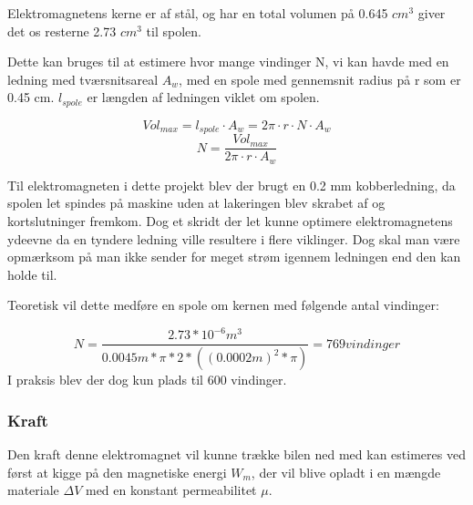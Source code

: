 Elektromagnetens kerne er af stål, og har en total volumen på 0.645 $cm^3$ giver det os resterne 2.73 $cm^3$ til spolen.

Dette kan bruges til at estimere hvor mange vindinger N, vi kan havde med en ledning med tværsnitsareal $A_w$, med en spole med gennemsnit radius på r som er 0.45 cm.  $l_{spole}$ er længden af ledningen viklet om spolen.

\begin{equation}
Vol_{max} =l_{spole} \cdot A_w = 2\pi \cdot r \cdot N \cdot A_w
\end{equation}
\begin{equation}
N= \frac{Vol_{max}}{2\pi \cdot r \cdot A_w}
\end{equation}

Til elektromagneten i dette projekt blev der brugt en 0.2 mm kobberledning, da spolen let spindes på maskine uden at lakeringen blev skrabet af og kortslutninger fremkom. Dog et skridt der let kunne optimere elektromagnetens ydeevne da en tyndere ledning ville resultere i flere viklinger. Dog skal man være opmærksom på man ikke sender for meget strøm igennem ledningen end den kan holde til.

Teoretisk vil dette medføre en spole om kernen med følgende antal vindinger:

\begin{equation}
N=\frac{2.73*10^{-6} m^3}{0.0045m*\pi*2*((0.0002m)^{2}*\pi)} = 769 vindinger
\end{equation}
I praksis blev der dog kun plads til 600 vindinger.

\subsubsection{Kraft}

Den kraft denne elektromagnet vil kunne trække bilen ned med kan estimeres ved først at kigge på den magnetiske energi $W_m$, der vil blive opladt i en mængde materiale $ \Delta V$ med en konstant permeabilitet $ \mu $. \cite{FysBog}

